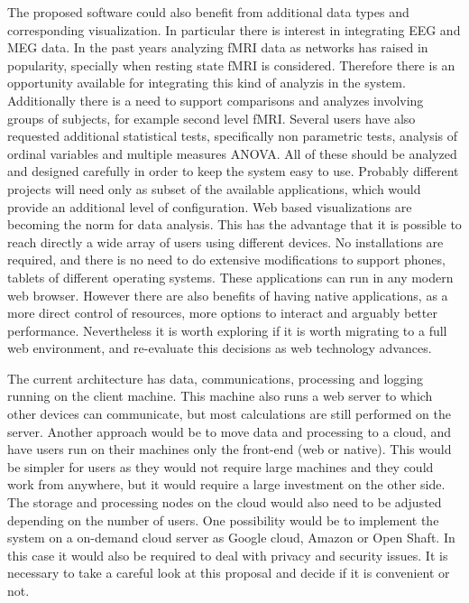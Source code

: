 The proposed software could also benefit from additional data types and corresponding visualization. In particular there is interest in integrating EEG and MEG data. In the past years analyzing fMRI data as networks has raised in popularity, specially when resting state fMRI is considered. Therefore there is an opportunity available for integrating this kind of analyzis in the system. Additionally there is a need to support comparisons and analyzes involving groups of subjects, for example second level fMRI. Several users have also requested additional statistical tests, specifically non parametric tests, analysis of ordinal variables and multiple measures ANOVA. All of these should be analyzed and designed carefully in order to keep the system easy to use. Probably different projects will need only as subset of the available applications, which would provide an additional level of configuration.
Web based visualizations are becoming the norm for data analysis. This has the advantage that it is possible to reach directly a wide array of users using different devices. No installations are required, and there is no need to do extensive modifications to support phones, tablets of different operating systems. These applications can run in any modern web browser. However there are also benefits of having native applications, as a more direct control of resources, more options to interact and arguably better performance. Nevertheless it is worth exploring if it is worth migrating to a full web environment, and re-evaluate this decisions as web technology advances.

The current architecture has data, communications, processing and logging running on the client machine. This machine also runs a web server to which other devices can communicate, but most calculations are still performed on the server. Another approach would be to move data and processing to a cloud, and have users run on their machines only the front-end (web or native). This would be simpler for users as they would not require large machines and they could work from anywhere, but it would require a large investment on the other side. The storage and processing nodes on the cloud would also need to be adjusted depending on the number of users. One possibility would be to implement the system on a on-demand cloud server as Google cloud, Amazon or Open Shaft. In this case it would also be required to deal with privacy and security issues. It is necessary to take a careful look at this proposal and decide if it is convenient or not.

